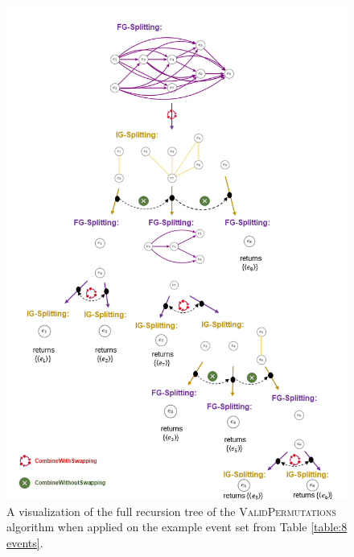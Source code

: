 \begin{figure}
	\centering
	\includegraphics[width=1 \columnwidth]{figures/alg_visualization_paper.png}
	\caption{A visualization of the full recursion tree of the \textsc{ValidPermutations} algorithm when applied on the example event set from Table \ref{table:8 events}.}
	\label{fig: algorithm visualization}
\end{figure}
%
%
%
%
%
%
% 

